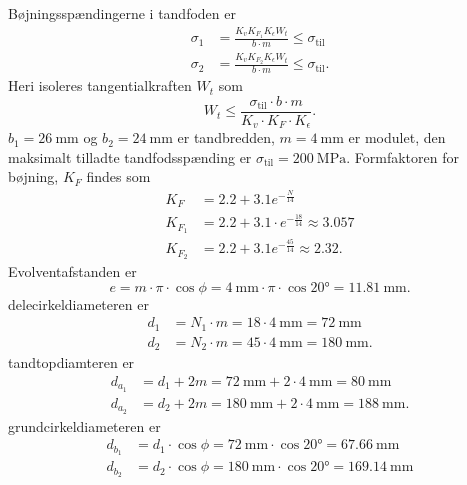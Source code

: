     \begin{derivation}
      Bøjningsspændingerne i tandfoden er
      \begin{align*}
        \sigma_1 &= \frac{K_v K_{F_1} K_{\epsilon} W_t}{b\cdot m} \leq \sigma_{\mathrm{til}}\\
        \sigma_2 &= \frac{K_v K_{F_2} K_{\epsilon} W_t}{b\cdot m} \leq \sigma_{\mathrm{til}}
      .\end{align*}
      Heri isoleres tangentialkraften $W_t$ som
      \begin{equation*}
        W_t \leq \frac{\sigma_{\mathrm{til}} \cdot b\cdot m}{K_v \cdot K_{F} \cdot K_{\epsilon}}
      .\end{equation*}
      $b_1 = \qty{26}{\mm} $ og $b_2 = \qty{24}{\mm} $ er tandbredden, $m = \qty{4}{\mm}$ er modulet, den maksimalt tilladte tandfodsspænding er $\sigma_{\mathrm{til}} = \qty{200}{\MPa}$.
      Formfaktoren for bøjning, $K_F$ findes som
      \begin{align*}
        K_F &= \num{2,2} + \num{3,1} e^{- \frac{N}{14}} \\
        K_{F_1} &= \num{2,2} + \num{3,1} \cdot e^{- \frac{18}{14}} \approx \num{3,057}  \\
        K_{F_2} &= \num{2,2} + \num{3,1} e^{- \frac{45}{14}} \approx \num{2,32} 
      .\end{align*}
      Evolventafstanden er
      \begin{equation*}
        e = m \cdot \pi \cdot \cos \phi = \qty{4}{\mm} \cdot \pi \cdot \cos \ang{20} = \qty{11,81}{\mm} 
      .\end{equation*}
      delecirkeldiameteren er
      \begin{align*}
        d_1 &= N_1 \cdot m = 18 \cdot \qty{4}{\mm} = \qty{72}{\mm}   \\
        d_2 &= N_2 \cdot m = 45 \cdot \qty{4}{\mm} = \qty{180}{\mm}
      .\end{align*}
      tandtopdiamteren er
      \begin{align*}
        d_{a_1} &= d_1 + 2 m = \qty{72}{\mm} + 2 \cdot \qty{4}{\mm} = \qty{80}{\mm}  \\
        d_{a_2} &= d_2 + 2 m = \qty{180}{\mm} + 2 \cdot \qty{4}{\mm} = \qty{188}{\mm} 
      .\end{align*}
      grundcirkeldiameteren er
      \begin{align*}
        d_{b_1} &= d_1 \cdot \cos \phi = \qty{72}{\mm} \cdot \cos \ang{20}  = \qty{67,66}{\mm} \\
        d_{b_2} &= d_2 \cdot \cos \phi = \qty{180}{\mm} \cdot \cos \ang{20} = \qty{169,14}{\mm} 

\end{align*}
\end{derivation}
